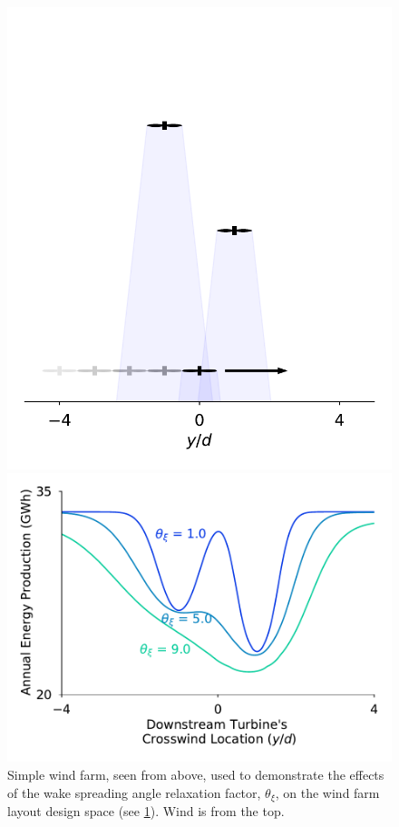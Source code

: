 \documentclass[a4paper]{jpconf}
\begin{document}
\begin{figure}[ht]
	\centering
	\begin{minipage}[t]{0.43\textwidth}
		\centering
		\includegraphics[width=\textwidth, trim={-0.5cm -0.5cm -0.5cm 3.25cm}, clip]{final_images/layouts/3turb-design-space}
		\caption{Simple wind farm, seen from above, used to demonstrate the effects of the wake spreading angle relaxation factor, $\theta_\xi$, on the wind farm layout design space (see \cref{fig:smoothing_locations_wec_a}). Wind is from the top.}
		\label{fig:smoothing_locations_wec_a}
	\end{minipage}\hspace{1pc}%
	\begin{minipage}[t]{0.52\textwidth}
		\centering
		\includegraphics[width=\textwidth]{smoothing_bpa_wec_a}

\end{minipage}
\end{figure}
\end{document}
